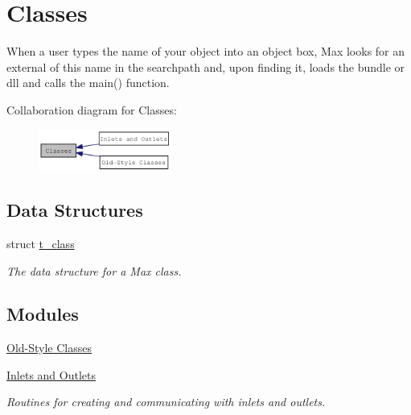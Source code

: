 \hypertarget{group__class}{
\section{Classes}
\label{group__class}
}


When a user types the name of your object into an object box, Max looks for an external of this name in the searchpath and, upon finding it, loads the bundle or dll and calls the main() function.  


Collaboration diagram for Classes:\nopagebreak
\begin{figure}[H]
\begin{center}
\leavevmode
\includegraphics[width=124pt]{group__class}
\end{center}
\end{figure}
\subsection*{Data Structures}
\begin{DoxyCompactItemize}
\item 
struct \hyperlink{structt__class}{t\_\-class}
\begin{DoxyCompactList}\small\item\em The data structure for a Max class. \item\end{DoxyCompactList}\end{DoxyCompactItemize}
\subsection*{Modules}
\begin{DoxyCompactItemize}
\item 
\hyperlink{group__class__old}{Old-\/Style Classes}
\item 
\hyperlink{group__inout}{Inlets and Outlets}


\begin{DoxyCompactList}\small\item\em Routines for creating and communicating with inlets and outlets. \item\end{DoxyCompactList}\end{DoxyCompactItemize}
